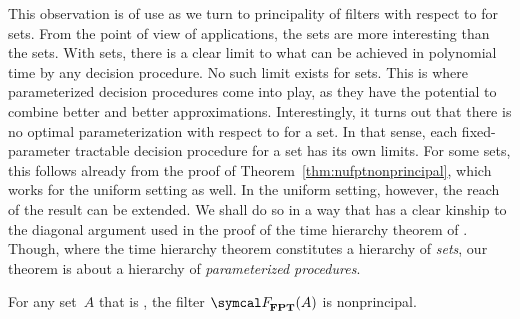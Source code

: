 %
This observation is of use as we turn to principality of filters with respect to  for  sets.
From the point of view of applications, the  sets are more interesting than the  sets.
With  sets, there is a clear limit to what can be achieved in polynomial time by any decision procedure.
No such limit exists for  sets.
This is where parameterized decision procedures come into play, as they have the potential to combine better and better approximations.
Interestingly, it turns out that there is no optimal parameterization with respect to  for a  set.
In that sense, each fixed-parameter tractable decision procedure for a  set has its own limits.
For some  sets, this follows already from the proof of Theorem~\ref{thm:nufptnonprincipal}, which works for the uniform setting as well.
In the uniform setting, however, the reach of the result can be extended.
We shall do so in a way that has a clear kinship to the diagonal argument used in the proof of the time hierarchy theorem of \textcite{hartmanis1965computational}.
Though, where the time hierarchy theorem constitutes a hierarchy of \emph{sets}, our theorem is about a hierarchy of \emph{parameterized procedures}.
\begin{theorem}
\label{thm:fptnonprincipal}%
  For any set~$A$ that is , the filter $\calF_\cl{FPT}(A)$ is nonprincipal.
\end{theorem}
